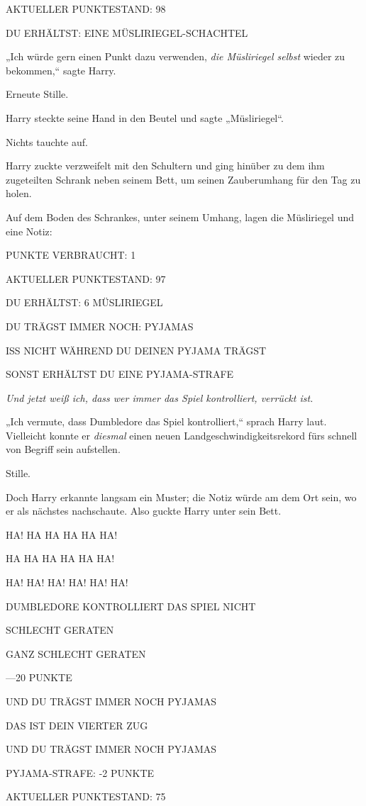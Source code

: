 {AKTUELLER PUNKTESTAND: 98

DU ERHÄLTST: EINE MÜSLIRIEGEL-SCHACHTEL

„Ich würde gern einen Punkt dazu verwenden, \emph{die Müsliriegel selbst} wieder zu bekommen,“ sagte Harry.

Erneute Stille.

Harry steckte seine Hand in den Beutel und sagte „Müsliriegel“.

Nichts tauchte auf.

Harry zuckte verzweifelt mit den Schultern und ging hinüber zu dem ihm zugeteilten Schrank neben seinem Bett, um seinen Zauberumhang für den Tag zu holen.

Auf dem Boden des Schrankes, unter seinem Umhang, lagen die Müsliriegel und eine Notiz:

PUNKTE VERBRAUCHT: 1

AKTUELLER PUNKTESTAND: 97

DU ERHÄLTST: 6 MÜSLIRIEGEL

DU TRÄGST IMMER NOCH: PYJAMAS

ISS NICHT WÄHREND DU DEINEN PYJAMA TRÄGST

SONST ERHÄLTST DU EINE PYJAMA-STRAFE

\emph{Und jetzt weiß ich, dass wer immer das Spiel kontrolliert, verrückt ist.}

„Ich vermute, dass Dumbledore das Spiel kontrolliert,“ sprach Harry laut. Vielleicht konnte er \emph{diesmal} einen neuen Landgeschwindigkeitsrekord fürs schnell von Begriff sein aufstellen.

Stille.

Doch Harry erkannte langsam ein Muster; die Notiz würde am dem Ort sein, wo er als nächstes nachschaute. Also guckte Harry unter sein Bett.

HA! HA HA HA HA HA!

HA HA HA HA HA HA!

HA! HA! HA! HA! HA! HA!

DUMBLEDORE KONTROLLIERT DAS SPIEL NICHT

SCHLECHT GERATEN

GANZ SCHLECHT GERATEN

—20 PUNKTE

UND DU TRÄGST IMMER NOCH PYJAMAS

DAS IST DEIN VIERTER ZUG

UND DU TRÄGST IMMER NOCH PYJAMAS

PYJAMA-STRAFE: -2 PUNKTE

AKTUELLER PUNKTESTAND: 75

}
